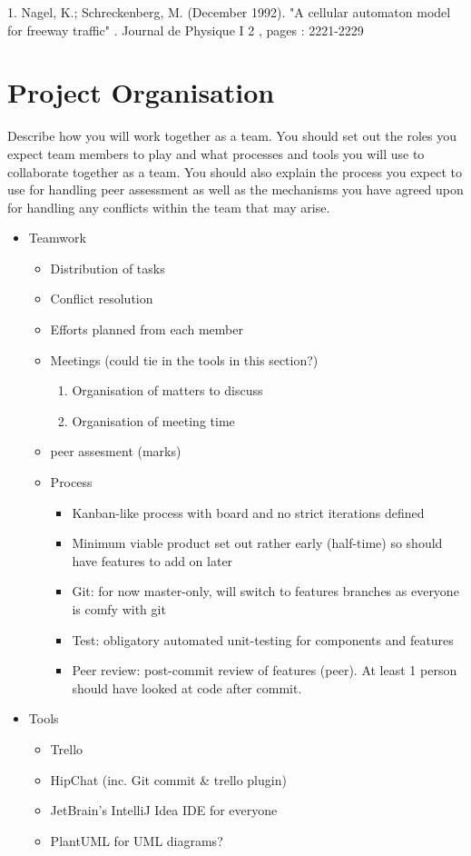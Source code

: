 1. Nagel, K.; Schreckenberg, M. (December 1992).  
"A cellular automaton model for freeway traffic" . Journal de Physique I 2 , pages : 2221-2229

\section{Project Organisation} %
Describe how you will work together as a team. You should set out the roles you expect team members to play and what
processes and tools you will use to collaborate together as a team. You should also explain the process you expect to
use for handling peer assessment as well as the mechanisms you have agreed upon for handling any conflicts within the
team that may arise.

\begin{itemize}
	\item Teamwork
	\begin{itemize}
		\item Distribution of tasks
    	\item Conflict resolution
    	\item Efforts planned from each member
    	\item Meetings (could tie in the tools in this section?)
        \begin{enumerate}
            \item Organisation of matters to discuss
            \item Organisation of meeting time
        \end{enumerate}
        \item peer assesment (marks)

        \item Process
        \begin{itemize}
            \item Kanban-like process with board and no strict iterations defined
            \item Minimum viable product set out rather early (half-time) so should have features to add on later
            \item Git: for now master-only, will switch to features branches as everyone is comfy with git
            \item Test: obligatory automated unit-testing for components and features
            \item Peer review: post-commit review of features (peer). At least 1 person should have looked at code after commit.
        \end{itemize}
	\end{itemize}

	\item Tools
	\begin{itemize}
		\item Trello
		\item HipChat (inc. Git commit & trello plugin)
	    \item JetBrain's IntelliJ Idea IDE for everyone
	    \item PlantUML for UML diagrams?
	\end{itemize}

\end{itemize}



